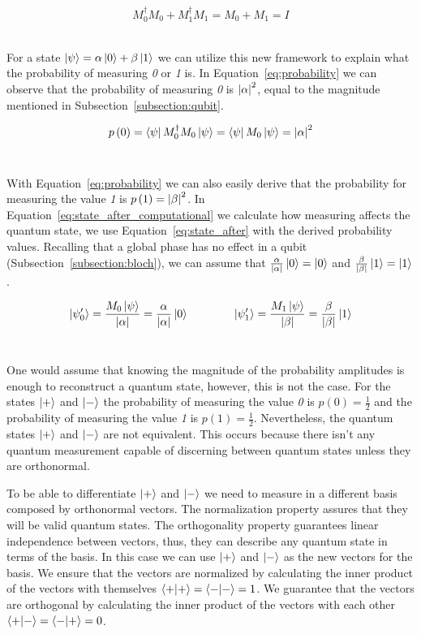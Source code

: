 \begin{equation}\label{eq:completeness_computational}
  M_0^{\dag}M_0 + M_1^{\dag}M_1 = M_0 + M_1 = I
\end{equation} \

For a state \(\ket{\psi} = \alpha\ket{0} + \beta\ket{1}\) we
can utilize this new framework to explain what the probability
of measuring \textit{0} or \textit{1} is. In Equation~\ref{eq:probability}
we can observe that the probability of measuring \textit{0} is
\(\abs{\alpha}^2\), equal to the magnitude mentioned
in Subsection~\ref{subsection:qubit}. \

\begin{equation}\label{eq:probability}
  p\left(0\right) = \bra{\psi}M_0^{\dag}M_0\ket{\psi} =
  \bra{\psi}M_0\ket{\psi} = \abs{\alpha}^2
\end{equation} \

With Equation~\ref{eq:probability} we can also easily derive that the probability for
measuring the value \textit{1} is \(p\left(1\right) = \abs{\beta}^2\).
In Equation~\ref{eq:state_after_computational} we calculate how measuring
affects the quantum state, we use Equation~\ref{eq:state_after} with the
derived probability values. Recalling that a global phase has no effect
in a qubit (Subsection~\ref{subsection:bloch}), we can assume that
\(\frac{\alpha}{\abs{\alpha}}\ket{0} = \ket{0}\) and
\(\frac{\beta}{\abs{\beta}}\ket{1} = \ket{1}\). \

\begin{equation}\label{eq:state_after_computational}
    \ket{\psi_0'} = \frac{M_0\ket{\psi}}{\abs{\alpha}} =
    \frac{\alpha}{\abs{\alpha}}\ket{0} \qquad \qquad
    \ket{\psi_1'} = \frac{M_1\ket{\psi}}{\abs{\beta}} =
    \frac{\beta}{\abs{\beta}}\ket{1}
\end{equation} \

One would assume that knowing the magnitude of the probability amplitudes
is enough to reconstruct a quantum state, however, this is not the case.
For the states \(\ket{+}\) and \(\ket{-}\) the probability of measuring
the value \textit{0} is \(p\left(0\right) = \frac{1}{2}\) and the probability
of measuring the value \textit{1} is \(p\left(1\right) = \frac{1}{2}\).
Nevertheless, the quantum states \(\ket{+}\) and \(\ket{-}\) are not
equivalent. This occurs because there isn't any quantum measurement capable
of discerning between quantum states unless they are orthonormal.\

To be able to differentiate \(\ket{+}\) and \(\ket{-}\) we
need to measure in a different basis composed by orthonormal vectors.
The normalization property assures that they will be valid quantum states.
The orthogonality property guarantees linear independence between vectors,
thus, they can describe any quantum state in terms of the basis. In
this case we can use \(\ket{+}\) and \(\ket{-}\) as the new vectors for
the basis. We ensure that the vectors are normalized by calculating the
inner product of the vectors with themselves \(\braket{+}{+}=\braket{-}{-}=1\).
We guarantee that the vectors are orthogonal by calculating the
inner product of the vectors with each other \(\braket{+}{-}=\braket{-}{+}=0\). \


